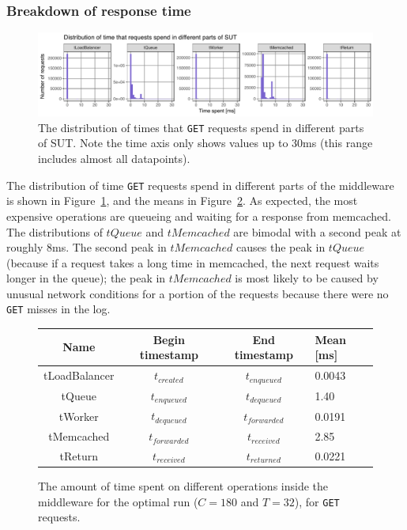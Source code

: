 \documentclass[11pt]{article}
\newcommand{\get}[0]{\texttt{GET}}
\begin{document}
\subsubsection{Breakdown of response time}

\begin{figure}[h]
\centering
\includegraphics[width=\textwidth]{../results/throughput/graphs/response_time_breakdown.pdf}
\caption{The distribution of times that \get{} requests spend in different parts of SUT. Note the time axis only shows values up to 30ms (this range includes almost all datapoints).}
\label{fig:exp1:res:breakdown}
\end{figure}

The distribution of time \get{} requests spend in different parts of the middleware is shown in Figure~\ref{fig:exp1:res:breakdown}, and the means in Figure~\ref{fig:exp1:table}. As expected, the most expensive operations are queueing and waiting for a response from memcached. The distributions of $tQueue$ and $tMemcached$ are bimodal with a second peak at roughly 8ms. The second peak in $tMemcached$ causes the peak in $tQueue$ (because if a request takes a long time in memcached, the next request waits longer in the queue); the peak in $tMemcached$ is most likely to be caused by unusual network conditions for a portion of the requests because there were no \get{} misses in the log.

\begin{figure}[h]
\begin{center}
	\begin{tabular}{|c|c|c|l |}
	\hline \textbf{Name} & \textbf{Begin timestamp} & \textbf{End timestamp} & \textbf{Mean [ms]} \\
	\hline tLoadBalancer & $t_{created}$ & $t_{enqueued}$ & 0.0043 \\
	\hline tQueue & $t_{enqueued}$ & $t_{dequeued}$ & 1.40 \\
	\hline tWorker & $t_{dequeued}$ & $t_{forwarded}$ & 0.0191 \\
	\hline tMemcached & $t_{forwarded}$ & $t_{received}$ & 2.85 \\
	\hline tReturn & $t_{received}$ & $t_{returned}$ & 0.0221 \\
	\end{tabular}
	\caption{The amount of time spent on different operations inside the middleware for the optimal run ($C=180$ and $T=32$), for \get{} requests.}
	\label{fig:exp1:table}
\end{center}
\end{figure}
\end{document}
